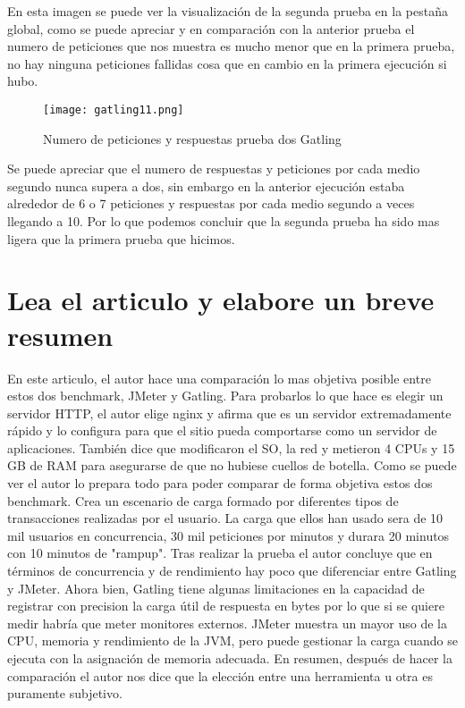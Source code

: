 En esta imagen se puede ver la visualización de la segunda prueba en la pestaña global, como se puede apreciar y en comparación con la anterior prueba el numero de peticiones que nos muestra es mucho menor que en la primera prueba, no hay ninguna peticiones fallidas cosa que en cambio en la primera ejecución si hubo.
\begin{figure}[H] 
\centering
\texttt{[image: gatling11.png]}  
\label{figura29:}
\caption{Numero de peticiones y respuestas prueba dos Gatling}
\end{figure}
Se puede apreciar que el numero de respuestas y peticiones por cada medio segundo nunca supera a dos, sin embargo en la anterior ejecución estaba alrededor de 6 o 7 peticiones y respuestas por cada medio segundo a veces llegando a 10. Por lo que podemos concluir que la segunda prueba ha sido mas ligera que la primera prueba que hicimos.
\section{Lea el articulo y elabore un breve resumen}
En este articulo, el autor hace una comparación lo mas objetiva posible entre estos dos benchmark, JMeter y Gatling. Para probarlos lo que hace es elegir un servidor HTTP, el autor elige nginx y afirma que es un servidor extremadamente rápido y lo configura para que el sitio pueda comportarse como un servidor de aplicaciones. También dice que modificaron el SO, la red y metieron 4 CPUs y 15 GB de RAM para asegurarse de que no hubiese cuellos de botella. Como se puede ver el autor lo prepara todo para poder comparar de forma objetiva estos dos benchmark.
Crea un escenario de carga formado por diferentes tipos de transacciones realizadas por el usuario. La carga que ellos han usado sera de 10 mil usuarios en concurrencia, 30 mil peticiones por minutos y durara 20 minutos con 10 minutos de "rampup". Tras realizar la prueba el autor concluye que en términos de concurrencia y de rendimiento hay poco que diferenciar entre Gatling y JMeter. Ahora bien, Gatling tiene algunas limitaciones en la capacidad de registrar con precision la carga útil de respuesta en bytes por lo que si se quiere medir habría que meter monitores externos. JMeter muestra un mayor uso de la CPU, memoria y rendimiento de la JVM, pero puede gestionar la carga cuando se ejecuta con la asignación de memoria adecuada. En resumen, después de hacer la comparación el autor nos dice que la elección entre una herramienta u otra es puramente subjetivo.
